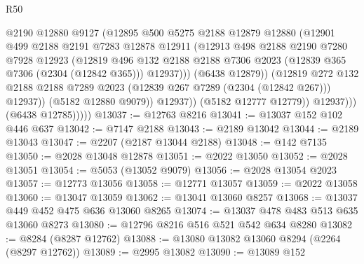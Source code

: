 \begin{lexlean}{R50}
\begin{coremodule}
                            @2190
                            @12880
                            @9127
                            (@12895
                              @500
                              @5275
                              @2188
                              @12879
                              @12880
                              (@12901
                                @499
                                @2188
                                @2191
                                @7283
                                @12878
                                @12911
                                (@12913
                                  @498
                                  @2188
                                  @2190
                                  @7280
                                  @7928
                                  @12923
                                  (@12819
                                    @496
                                    @132
                                    @2188
                                    @2188
                                    @7306
                                    @2023
                                    (@12839 @365 @7306 (@2304 (@12842 @365)))
                                    @12937)))
                              (@6438 @12879))
                            (@12819
                              @272
                              @132
                              @2188
                              @2188
                              @7289
                              @2023
                              (@12839 @267 @7289 (@2304 (@12842 @267)))
                              @12937))
                          (@5182 @12880 @9079))
                        @12937))
                    (@5182 @12777 @12779))
                  @12937)))
            (@6438 @12785)))))
@13037 := @12763 @8216
@13041 := @13037 @152 @102 @446 @637
@13042 := @7147 @2188
@13043 := @2189 @13042
@13044 := @2189 @13043
@13047 := @2207 (@2187 @13044 @2188)
@13048 := @142 @7135
@13050 := @2028 @13048 @12878
@13051 := @2022 @13050
@13052 := @2028 @13051
@13054 := @5053 (@13052 @9079)
@13056 := @2028 @13054 @2023
@13057 := @12773 @13056
@13058 := @12771 @13057
@13059 := @2022 @13058
@13060 := @13047 @13059
@13062 := @13041 @13060 @8257
@13068 := @13037 @449 @452 @475 @636 @13060 @8265
@13074 := @13037 @478 @483 @513 @635 @13060 @8273
@13080 := @12796 @8216 @516 @521 @542 @634 @8280
@13082 := @8284 (@8287 @12762)
@13088 := @13080 @13082 @13060 @8294 (@2264 (@8297 @12762))
@13089 := @2995 @13082
@13090 := @13089 @152

\end{coremodule}
\end{lexlean}
